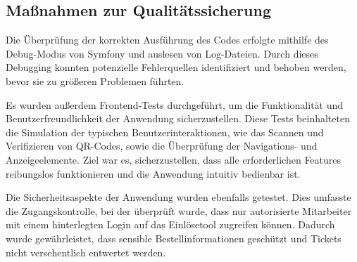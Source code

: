 



\subsection{Maßnahmen zur Qualitätssicherung}
\label{sec:Qualitaetssicherung}

Die Überprüfung der korrekten Ausführung des Codes erfolgte mithilfe des Debug-Modus von Symfony und auslesen von Log-Dateien. Durch dieses Debugging konnten potenzielle Fehlerquellen identifiziert und behoben werden, bevor sie zu größeren Problemen führten.

Es wurden außerdem Frontend-Tests durchgeführt, um die Funktionalität und Benutzerfreundlichkeit der Anwendung sicherzustellen. Diese Tests beinhalteten die Simulation der typischen Benutzerinteraktionen, wie das Scannen und Verifizieren von QR-Codes, sowie die Überprüfung der Navigations- und Anzeigeelemente. Ziel war es, sicherzustellen, dass alle erforderlichen Features reibungslos funktionieren und die Anwendung intuitiv bedienbar ist.

Die Sicherheitsaspekte der Anwendung wurden ebenfalls getestet. Dies umfasste die Zugangskontrolle, bei der überprüft wurde, dass nur autorisierte Mitarbeiter mit einem hinterlegten Login auf das Einlösetool zugreifen können. Dadurch wurde gewährleistet, dass sensible Bestellinformationen geschützt und Tickets nicht versehentlich entwertet werden.

